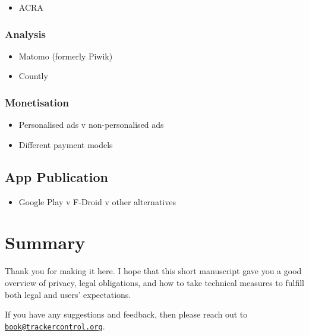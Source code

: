 \documentclass[
]{book}
\providecommand{\tightlist}{%
  \setlength{\itemsep}{0pt}\setlength{\parskip}{0pt}}
\begin{document}
\begin{itemize}
\tightlist
\item
  ACRA
\end{itemize}

\hypertarget{analysis}{%
\subsection{Analysis}\label{analysis}}

\begin{itemize}
\tightlist
\item
  Matomo (formerly Piwik)
\item
  Countly
\end{itemize}

\hypertarget{monetisation}{%
\subsection{Monetisation}\label{monetisation}}

\begin{itemize}
\tightlist
\item
  Personalised ads v non-personalised ads
\item
  Different payment models
\end{itemize}

\hypertarget{app-publication}{%
\section{App Publication}\label{app-publication}}

\begin{itemize}
\tightlist
\item
  Google Play v F-Droid v other alternatives
\end{itemize}

\hypertarget{summary}{%
\chapter{Summary}\label{summary}}

Thank you for making it here. I hope that this short manuscript gave you a good overview of privacy, legal obligations, and how to take technical measures to fulfill both legal and users' expectations.

If you have any suggestions and feedback, then please reach out to \href{mailto:book@trackercontrol.org}{\nolinkurl{book@trackercontrol.org}}.

  
\end{document}
